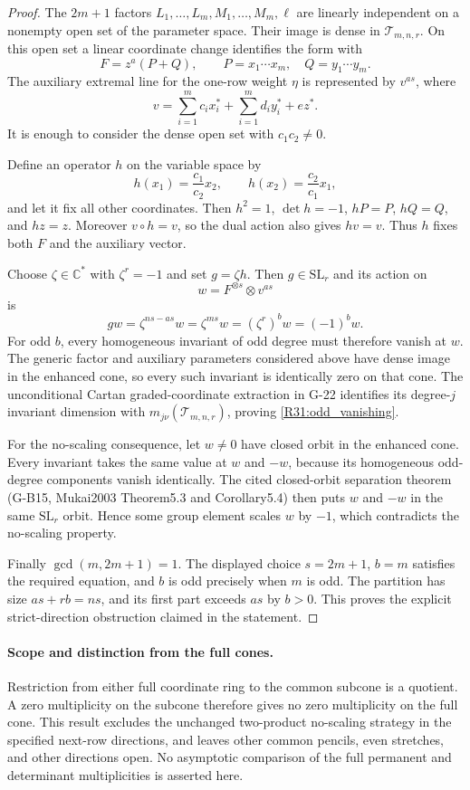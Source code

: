 \begin{proof}
The $2m+1$ factors $L_1,\ldots,L_m,M_1,\ldots,M_m,\ell$
are linearly independent on a nonempty open set of the parameter
space. Their image is dense in $\mathcal T_{m,n,r}$. On this
open set a linear coordinate change identifies the form with
\[
 F=z^a(P+Q),\qquad P=x_1\cdots x_m,\quad Q=y_1\cdots y_m.
\]
The auxiliary extremal line for the one-row weight $\eta$ is
represented by $v^{as}$, where
\[
 v=\sum_{i=1}^m c_i x_i^*+\sum_{i=1}^m d_i y_i^*+e z^*.
\]
It is enough to consider the dense open set with $c_1c_2\ne0$.

Define an operator $h$ on the variable space by
\[
 h(x_1)=\frac{c_1}{c_2}x_2,\qquad
 h(x_2)=\frac{c_2}{c_1}x_1,
\]
and let it fix all other coordinates. Then $h^2=1$,
$\det h=-1$, $hP=P$, $hQ=Q$, and $hz=z$. Moreover
$v\circ h=v$, so the dual action also gives $hv=v$.
Thus $h$ fixes both $F$ and the auxiliary vector.

Choose $\zeta\in\mathbb C^*$ with $\zeta^r=-1$ and set
$g=\zeta h$. Then $g\in\mathrm{SL}_r$ and its action on
\[
 w=F^{\otimes s}\otimes v^{as}
\]
is
\[
 gw=\zeta^{ns-as}w=\zeta^{ms}w
                    =(\zeta^r)^b w=(-1)^b w.
\]
For odd $b$, every homogeneous invariant of odd degree must
therefore vanish at $w$. The generic factor and auxiliary
parameters considered above have dense image in the enhanced
cone, so every such invariant is identically zero on that
cone. The unconditional Cartan graded-coordinate extraction
in G-22 identifies its degree-$j$ invariant dimension with
$m_{j\nu}(\mathcal T_{m,n,r})$, proving
\eqref{R31:odd_vanishing}.

For the no-scaling consequence, let $w\ne0$ have closed orbit
in the enhanced cone. Every invariant takes the same value at
$w$ and $-w$, because its homogeneous odd-degree components
vanish identically. The cited closed-orbit separation theorem
(G-B15, Mukai2003 Theorem5.3 and Corollary5.4) then puts $w$
and $-w$ in the same $\mathrm{SL}_r$ orbit. Hence some group
element scales $w$ by $-1$, which contradicts the no-scaling
property.

Finally $\gcd(m,2m+1)=1$. The displayed choice $s=2m+1$,
$b=m$ satisfies the required equation, and $b$ is odd precisely
when $m$ is odd. The partition has size $as+rb=ns$, and its
first part exceeds $as$ by $b>0$. This proves the explicit
strict-direction obstruction claimed in the statement.
\end{proof}

\paragraph{Scope and distinction from the full cones.}
Restriction from either full coordinate ring to the common
subcone is a quotient. A zero multiplicity on the subcone
therefore gives no zero multiplicity on the full cone.
This result excludes the unchanged two-product no-scaling
strategy in the specified next-row directions, and leaves
other common pencils, even stretches, and other directions
open. No asymptotic comparison of the full permanent and
determinant multiplicities is asserted here.


